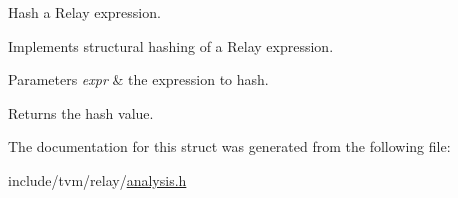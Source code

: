 Hash a Relay expression. 

Implements structural hashing of a Relay expression.


\begin{DoxyParams}{Parameters}
{\em expr} & the expression to hash.\\
\hline
\end{DoxyParams}
\begin{DoxyReturn}{Returns}
the hash value. 
\end{DoxyReturn}


The documentation for this struct was generated from the following file\+:\begin{DoxyCompactItemize}
\item 
include/tvm/relay/\hyperlink{analysis_8h}{analysis.\+h}\end{DoxyCompactItemize}
